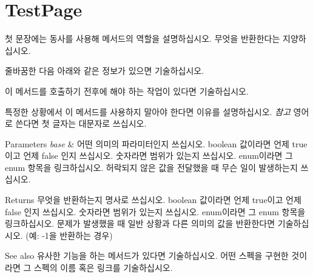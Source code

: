 \chapter{Test\+Page}
\hypertarget{_test_page}{}\label{_test_page}
첫 문장에는 동사를 사용해 메서드의 역할을 설명하십시오. \textquotesingle{}무엇을 반환한다\textquotesingle{}는 지양하십시오.

줄바꿈한 다음 아래와 같은 정보가 있으면 기술하십시오.
\begin{DoxyItemize}
\item 이 메서드를 호출하기 전후에 해야 하는 작업이 있다면 기술하십시오.
\item 특정한 상황에서 이 메서드를 사용하지 말아야 한다면 이유를 설명하십시오. {\itshape 참고} 영어로 쓴다면 첫 글자는 대문자로 쓰십시오.
\end{DoxyItemize}


\begin{DoxyParams}{Parameters}
{\em base} & 어떤 의미의 파라미터인지 쓰십시오. boolean 값이라면 언제 true이고 언제 false 인지 쓰십시오. 숫자라면 범위가 있는지 쓰십시오. enum이라면 그 enum 항목을 링크하십시오. 허락되지 않은 값을 전달했을 때 무슨 일이 발생하는지 쓰십시오. \\
\hline
\end{DoxyParams}
\begin{DoxyReturn}{Returns}
무엇을 반환하는지 명사로 쓰십시오. boolean 값이라면 언제 true이고 언제 false 인지 쓰십시오. 숫자라면 범위가 있는지 쓰십시오. enum이라면 그 enum 항목을 링크하십시오. 문제가 발생했을 때 일반 상황과 다른 의미의 값을 반환한다면 기술하십시오. (예\+: -\/1을 반환하는 경우) 
\end{DoxyReturn}
\begin{DoxySeeAlso}{See also}
유사한 기능을 하는 메서드가 있다면 기술하십시오. 어떤 스펙을 구현한 것이라면 그 스펙의 이름 혹은 링크를 기술하십시오. 
\end{DoxySeeAlso}
